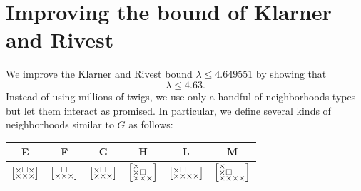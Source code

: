 \documentclass[a4paper,12pt]{article}
\makeatletter
\newenvironment{grid}
  {\begingroup\footnotesize
   \renewcommand{\arraystretch}{0}
   \setlength{\arraycolsep}{0pt}
   \left[\begin{array}{@{}*{10}{c}@{}}}
  {\end{array}\right]\endgroup}
\newcommand{\void}{\phantom{\times}}
\newcommand{\myE}{
    \begin{grid}
        \times & \square & \times \\
        \times & \times & \times
    \end{grid}
}
\newcommand{\myF}{
    \begin{grid}
        \void & \square & \void \\
        \times & \times & \times
    \end{grid}
}
\newcommand{\myG}{
    \begin{grid}
        \times & \square & \void \\
        \times & \times & \times
    \end{grid}
}
\newcommand{\myH}{
    \begin{grid}
        \times & \void & \void \\
        \times & \square & \void \\
        \times & \times & \times
    \end{grid}
}
\newcommand{\myL}{
    \begin{grid}
        \times & \square & \void & \void \\
        \times & \times & \times & \times
    \end{grid}
}
\newcommand{\myM}{
    \begin{grid}
        \times & \void & \void & \void \\
        \times & \square & \void & \void \\
        \times & \times & \times & \times
    \end{grid}
}
\makeatother
\begin{document}
\section{Improving the bound of Klarner and Rivest} \label{sec:klarner-rivest}
We improve the Klarner and Rivest bound $\lambda\le 4.649551$ by showing that
\[
    \lambda\le 4.63.
\]
Instead of using millions of twigs, we use only a handful of neighborhoods types but let them interact as promised.
In particular, we define several kinds of neighborhoods similar to $G$ as follows:
\begin{center}
\begin{tabular}{ |c|c|c|c|c|c| } 
 \hline
 E & F & G & H & L & M \\ 
 \hline
 $\myE$ & $\myF$ & $\myG$ & $\myH$ & $\myL$ & $\myM$ \\ 
 \hline
\end{tabular}
\end{center}
\end{document}
